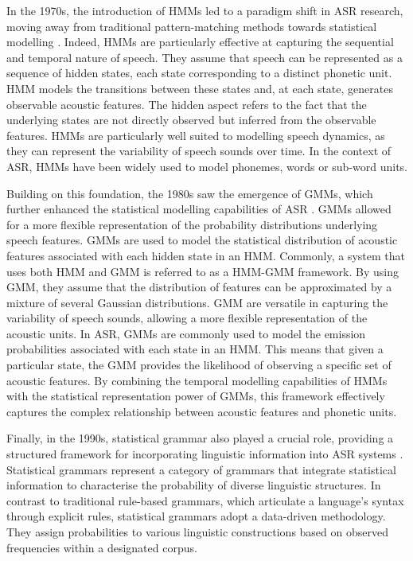 In the 1970s, the introduction of \acp{HMM} led to a paradigm shift in \ac{ASR} research, moving away from traditional pattern-matching methods towards statistical modelling \cite{first_asr}. Indeed, \acp{HMM} are particularly effective at capturing the sequential and temporal nature of speech. They assume that speech can be represented as a sequence of hidden states, each state corresponding to a distinct phonetic unit. \ac{HMM} models the transitions between these states and, at each state, generates observable acoustic features. The hidden aspect refers to the fact that the underlying states are not directly observed but inferred from the observable features. \acp{HMM} are particularly well suited to modelling speech dynamics, as they can represent the variability of speech sounds over time. In the context of \ac{ASR}, \acp{HMM} have been widely used to model phonemes, words or sub-word units.

Building on this foundation, the 1980s saw the emergence of \acp{GMM}, which further enhanced the statistical modelling capabilities of \ac{ASR} \cite{htk_book}. \acp{GMM} allowed for a more flexible representation of the probability distributions underlying speech features.
\acp{GMM} are used to model the statistical distribution of acoustic features associated with each hidden state in an \ac{HMM}. Commonly, a system that uses both \ac{HMM} and \ac{GMM} is referred to as a \ac{HMM-GMM} framework. By using \ac{GMM}, they assume that the distribution of features can be approximated by a mixture of several Gaussian distributions. \ac{GMM} are versatile in capturing the variability of speech sounds, allowing a more flexible representation of the acoustic units. In \ac{ASR}, \acp{GMM} are commonly used to model the emission probabilities associated with each state in an \ac{HMM}. This means that given a particular state, the \ac{GMM} provides the likelihood of observing a specific set of acoustic features. By combining the temporal modelling capabilities of \acp{HMM} with the statistical representation power of \acp{GMM}, this framework effectively captures the complex relationship between acoustic features and phonetic units.

Finally, in the 1990s, statistical grammar also played a crucial role, providing a structured framework for incorporating linguistic information into \ac{ASR} systems \cite{darpa1992}. Statistical grammars represent a category of grammars that integrate statistical information to characterise the probability of diverse linguistic structures. In contrast to traditional rule-based grammars, which articulate a language's syntax through explicit rules, statistical grammars adopt a data-driven methodology. They assign probabilities to various linguistic constructions based on observed frequencies within a designated corpus.

